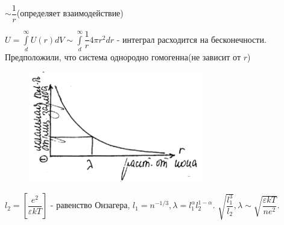 \begin{lecture}
\begin{lecSection}
$\sim \dfrac{1}{r}$(определяет взаимодействие)
\par $U = \int\limits_{d}^{\infty} U(r)dV \sim \int\limits_{d}^{\infty} \dfrac{1}{r} 4 \pi r^2 dr$ - интеграл расходится на бесконечности. Предположили, что система однородно гомогенна(не зависит от $r$)	

\begin{figure}[H]
	
	\centering\includegraphics[width=0.6\linewidth]{lecture_09/new_pic8}
	
\end{figure}
	
	$l_2 = \left[\dfrac{e^2}{\varepsilon k T}\right]$ - равенство Онзагера, $l_1 = n^{-1/3}, \lambda = l_1^\alpha l_2^{1- \alpha}$. $\sqrt{\dfrac{l_1^3}{l_2}}, \lambda \sim \sqrt{\dfrac{\varepsilon k T}{n e^2}}.$
	
\end{lecSection}
			
\end{lecture}
